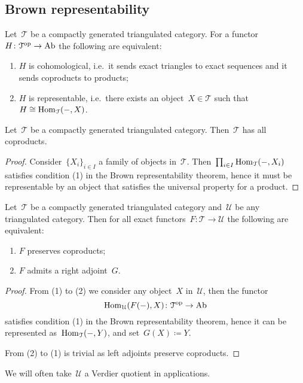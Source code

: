 \documentclass[10pt,a4paper]{article}
\begin{document}
\subsection{Brown representability}
\begin{theorem}
  Let~$\mathcal{T}$ be a compactly generated triangulated category. For a functor~$H\colon\mathcal{T}^{\mathrm{op}}\to\mathrm{Ab}$ the following are equivalent:
  \begin{enumerate}
    \item $H$ is cohomological, i.e.\ it sends exact triangles to exact sequences and it sends coproducts to products;
    \item $H$ is representable, i.e.\ there exists an object~$X\in\mathcal{T}$ such that~$H\cong\operatorname{Hom}_{\mathcal{T}}(-,X)$.
  \end{enumerate}
\end{theorem}
\begin{corollary}
  Let~$\mathcal{T}$ be a compactly generated triangulated category. Then~$\mathcal{T}$ has all coproducts.
  \begin{proof}
    Consider~$\{X_i\}_{i\in I}$ a family of objects in~$\mathcal{T}$. Then~$\prod_{i\in I}\operatorname{Hom}_{\mathcal{T}}(-,X_i)$ satisfies condition (1) in the Brown representability theorem, hence it must be representable by an object that satisfies the universal property for a product.
  \end{proof}
\end{corollary}
\begin{corollary}
  Let~$\mathcal{T}$ be a compactly generated triangulated category and~$\mathcal{U}$ be any triangulated category. Then for all exact functors~$F\colon\mathcal{T}\to\mathcal{U}$ the following are equivalent:
  \begin{enumerate}
    \item $F$ preserves coproducts;
    \item $F$ admits a right adjoint~$G$.
  \end{enumerate}
  \begin{proof}
    From (1) to (2) we consider any object~$X$ in~$\mathcal{U}$, then the functor
    \begin{equation}
      \operatorname{Hom}_{\mathcal{U}}(F(-),X)\colon\mathcal{T}^{\mathrm{op}}\to\mathrm{Ab} 
    \end{equation}
    satisfies condition (1) in the Brown representability theorem, hence it can be represented as~$\operatorname{Hom}_{\mathcal{T}}(-,Y)$, and set~$G(X)\coloneqq Y$.

    From (2) to (1) is trivial as left adjoints preserve coproducts.
  \end{proof}
\end{corollary}
We will often take~$\mathcal{U}$ a Verdier quotient in applications.
\end{document}
